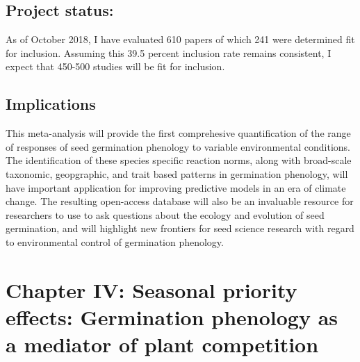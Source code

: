 \documentclass[12pt]{article}\usepackage[]{graphicx}\usepackage[]{color}
\begin{document}
\subsection*{Project status:}
As of October 2018, I have evaluated 610 papers of which 241 were determined fit for inclusion. Assuming this 39.5 percent inclusion rate remains consistent, I expect that 450-500 studies will be fit for inclusion.
\subsection*{Implications}
\indent\indent This meta-analysis will provide the first comprehesive quantification of the range of responses of seed germination phenology to variable environmental conditions. The identification of these species specific reaction norms, along with broad-scale taxonomic, geopgraphic, and trait based patterns in germination phenology, will have important application for improving predictive models in an era of climate change. The resulting open-access database will also be an invaluable resource for researchers to use to ask questions about the ecology and evolution of seed germination, and will highlight new frontiers for seed science research with regard to environmental control of germination phenology.

\section*{Chapter IV: Seasonal priority effects: Germination phenology as a mediator of plant competition}
\end{document}
